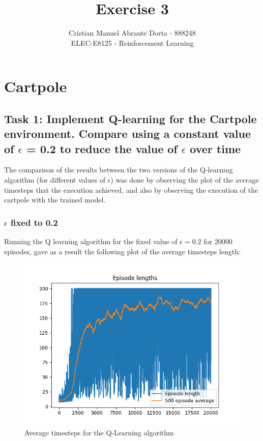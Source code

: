 \documentclass[12pt]{article}
\begin{document}
 
\title{Exercise 3}
\author{Cristian Manuel Abrante Dorta - 888248\\
ELEC-E8125 - Reinforcement Learning}

\maketitle
\section{Cartpole}

\subsection{Task 1: Implement Q-learning for the Cartpole environment. Compare using a constant value of $\epsilon$ = 0.2 to reduce the value of $\epsilon$ over time}

The comparison of the results between the two versions of the Q-learning algorithm (for different values of $\epsilon$) was done by observing the plot of the average timesteps that the execution achieved, and also by observing the execution of the cartpole with the trained model.

\subsubsection{$\epsilon$ fixed to 0.2}

Running the Q learning algorithm for the fixed value of $\epsilon=0.2$ for 20000 episodes, gave as a result the following plot of the average timesteps length:

\begin{figure}[h]
    \centering
    \includegraphics[scale=0.6]{exercise-3/plots/episodes-fixed-0.2.png}
    \caption{Average timesteps for the Q-Learning algorithm}
    \label{fig:fixed-0.2}
\end{figure}
\end{document}
